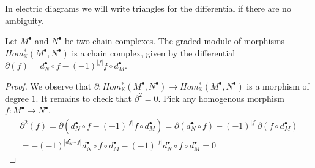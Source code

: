 \documentclass[../thesis.tex]{subfiles}
\begin{document}
            In electric diagrams we will write triangles for the differential if there are no ambiguity.

            \begin{center}
            \end{center}

            \begin{proposition}
                Let $M^{\bullet}$ and $N^{\bullet}$ be two chain complexes. The graded module of morphisms $Hom_{\mathbb{K}}^*(M^{\bullet},N^{\bullet})$ is a chain complex, given by the differential $\partial(f) = d_N^{\bullet}\circ f - (-1)^{|f|}f\circ d_M^{\bullet}$.
            \end{proposition}

            \begin{proof}
                We observe that $\partial : Hom_{\mathbb{K}}^*(M^{\bullet},N^{\bullet}) \rightarrow Hom_{\mathbb{K}}^*(M^{\bullet},N^{\bullet})$ is a morphism of degree $1$. It remains to check that $\partial^2 = 0$. Pick any homogenous morphism $f : M^{\bullet}\rightarrow N^{\bullet}$.
                \begin{multline*}
                    \partial^2(f) = \partial(d_N^{\bullet}\circ f - (-1)^{|f|}f\circ d_M^{\bullet}) = \partial(d_N^{\bullet}\circ f) - (-1)^{|f|}\partial(f\circ d_M^{\bullet}) \\ = - (-1)^{|d_N^{\bullet}\circ f|}d_N^{\bullet}\circ f\circ d_M^{\bullet} - (-1)^{|f|}d_N^{\bullet}\circ f\circ d_M^{\bullet} = 0
                \end{multline*}
            \end{proof}
\end{document}
